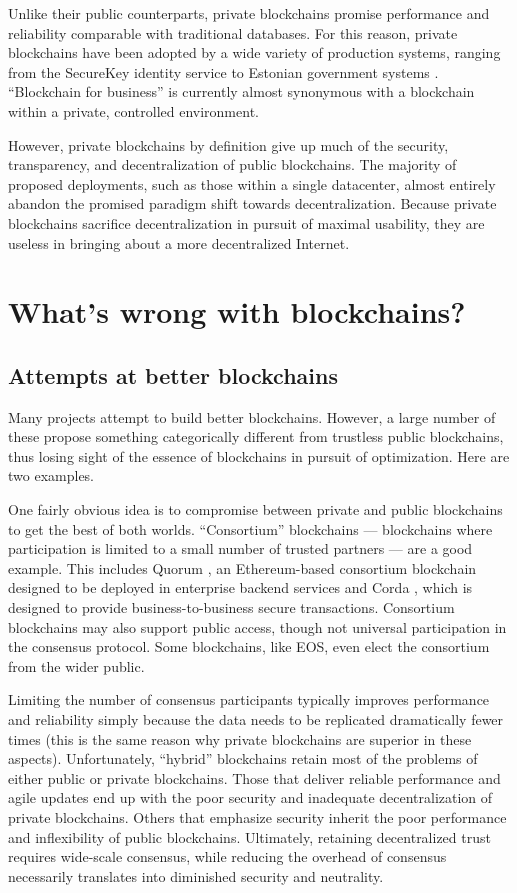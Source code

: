 \documentclass[headinclude,12pt]{scrbook}
\begin{document}
Unlike their public counterparts, private blockchains promise performance and reliability comparable with traditional databases. For this reason, private blockchains have been adopted by a wide variety of production systems, ranging from the SecureKey identity service \cite{securekey} to Estonian government systems \cite{estonia}. ``Blockchain for business'' is currently almost synonymous with a blockchain within a private, controlled environment.

However, private blockchains by definition give up much of the security, transparency, and decentralization of public blockchains. The majority of proposed deployments, such as those within a single datacenter, almost entirely abandon the promised paradigm shift towards decentralization. Because private blockchains sacrifice decentralization in pursuit of maximal usability, they are useless in bringing about a more decentralized Internet.


\section{What's wrong with blockchains?}

\subsection{Attempts at better blockchains}

Many projects attempt to build better blockchains. However, a large number of these propose something categorically different from trustless public blockchains, thus losing sight of the essence of blockchains in pursuit of optimization. Here are two examples.

One fairly obvious idea is to compromise between private and public blockchains to get the best of both worlds. ``Consortium'' blockchains --- blockchains where participation is limited to a small number of trusted partners --- are a good example. This includes Quorum \cite{quorum}, an Ethereum-based consortium blockchain designed to be deployed in enterprise backend services and Corda \cite{corda}, which is designed to provide business-to-business secure transactions.  Consortium blockchains may also support public access, though not universal participation in the consensus protocol. Some blockchains, like EOS, even elect the consortium from the wider public.

Limiting the number of consensus participants typically improves performance and reliability simply because the data needs to be replicated dramatically fewer times (this is the same reason why private blockchains are superior in these aspects). Unfortunately, ``hybrid'' blockchains retain most of the problems of either public or private blockchains. Those that deliver reliable performance and agile updates end up with the poor security and inadequate decentralization of private blockchains. Others that emphasize security inherit the poor performance and inflexibility of public blockchains. Ultimately, retaining decentralized trust requires wide-scale consensus, while reducing the overhead of consensus necessarily translates into diminished security and neutrality.
\end{document}
